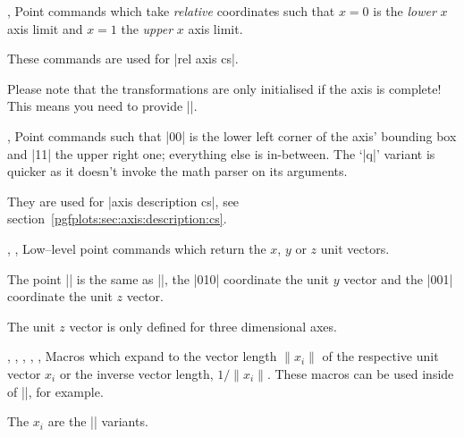 \begin{commandlist}{%
	\pgfplotspointrelaxisxy{},%
	\pgfplotspointrelaxisxyz{}}
	Point commands which take \emph{relative} coordinates such that $x=0$ is the \emph{lower} $x$ axis limit and $x=1$ the \emph{upper} $x$ axis limit.

	These commands are used for |rel axis cs|.

	Please note that the transformations are only initialised if the axis is complete! This means you need to provide |\pgfplotsextra|.
\end{commandlist}

\begin{commandlist}{%
	\pgfplotspointdescriptionxy{},%
	\pgfplotsqpointdescriptionxy{}}%
	Point commands such that |{0}{0}| is the lower left corner of the axis' bounding box and |{1}{1}| the upper right one; everything else is in-between. The `|q|' variant is quicker as it doesn't invoke the math parser on its arguments.

	They are used for |axis description cs|, see section~\ref{pgfplots:sec:axis:description:cs}.
\end{commandlist}

\begin{commandlist}{%
	\pgfplotspointunitx,%
	\pgfplotspointunity,%
	\pgfplotspointunitz}%
	Low--level point commands which return the $x$, $y$ or $z$ unit vectors.

	The point || is the same as |\pgfplotspointunitx|, the |{0}{1}{0}| coordinate the unit $y$ vector and the |{0}{0}{1}| coordinate the unit $z$ vector.

	The unit $z$ vector is only defined for three dimensional axes.
\end{commandlist}

\begin{commandlist}{%
	\pgfplotsunitxlength,%
	\pgfplotsunitylength,%
	\pgfplotsunitzlength,%
	\pgfplotsunitxinvlength,%
	\pgfplotsunityinvlength,%
	\pgfplotsunitzinvlength}%
	Macros which expand to the vector length $\lVert x_i \rVert$ of the respective unit vector $x_i$ or the inverse vector length, $1/\lVert x_i \rVert$. These macros can be used inside of |\pgfmathparse|, for example.

	The $x_i$ are the |\pgfplotspointunitx| variants.
\end{commandlist}

